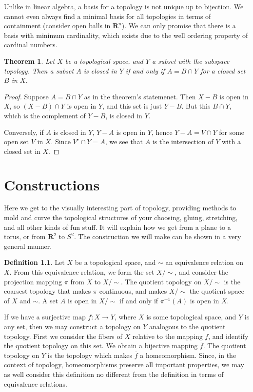 \documentclass{report}
\theoremstyle{plain}
\newtheorem{theorem}{Theorem}[section]
\theoremstyle{definition}
\newtheorem*{defi}{Definition}
\newenvironment{definition}
    {\begin{samepage}\begin{framed}\begin{defi}}
    {\end{defi}\end{framed}\end{samepage}}
\begin{document}
Unlike in linear algebra, a basis for a topology is not unique up to bijection. We cannot even always find a minimal basis for all topologies in terms of containment (consider open balls in $\mathbf{R}^n$). We can only promise that there is a basis with minimum cardinality, which exists due to the well ordering property of cardinal numbers.

\begin{theorem}
    Let $X$ be a topological space, and $Y$ a subset with the subspace topology. Then a subset $A$ is closed in $Y$ if and only if $A = B \cap Y$ for a closed set $B$ in $X$.
\end{theorem}
\begin{proof}
    Suppose $A = B \cap Y$ as in the theorem's statemenet. Then $X - B$ is open in $X$, so $(X - B) \cap Y$ is open in $Y$, and this set is just $Y - B$. But this $B \cap Y$, which is the complement of $Y - B$, is closed in $Y$.

    Conversely, if $A$ is closed in $Y$, $Y - A$ is open in $Y$, hence $Y - A = V \cap Y$ for some open set $V$ in $X$. Since $V^c \cap Y = A$, we see that $A$ is the intersection of $Y$ with a closed set in $X$.
\end{proof}

\chapter{Constructions}

Here we get to the visually interesting part of topology, providing methods to mold and curve the topological structures of your choosing, gluing, stretching, and all other kinds of fun stuff. It will explain how we get from a plane to a torus, or from $\mathbf{R}^2$ to $S^2$. The construction we will make can be shown in a very general manner.

\begin{definition}
    Let $X$ be a topological space, and $\sim$ an equivalence relation on $X$. From this equivalence relation, we form the set $X/\sim$, and consider the projection mapping $\pi$ from $X$ to $X/\sim$. The quotient topology on $X/\sim$ is the coarsest topology that makes $\pi$ continuous, and makes $X/\sim$ the quotient space of $X$ and $\sim$. A set $A$ is open in $X/\sim$ if and only if $\pi^{-1}(A)$ is open in $X$.
\end{definition}

If we have a surjective map $f:X \to Y$, where $X$ is some topological space, and $Y$ is any set, then we may construct a topology on $Y$ analogous to the quotient topology. First we consider the fibers of $X$ relative to the mapping $f$, and identify the quotient topology on this set. We obtain a bijective mapping $\overline{f}$. The quotient topology on $Y$ is the topology which makes $\overline{f}$ a homeomorphism. Since, in the context of topology, homeomorphisms preserve all important properties, we may as well consider this definition no different from the definition in terms of equivalence relations.
\end{document}
